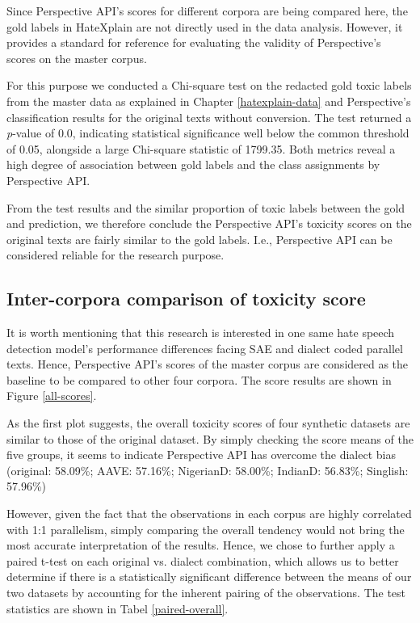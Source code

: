\documentclass[11pt]{article}
\begin{document}
Since Perspective API’s scores for different corpora are being compared here, the gold labels in HateXplain are not directly used in the data analysis. However, it provides a standard for reference for evaluating the validity of Perspective’s scores on the master corpus.

For this purpose we conducted a Chi-square test on the redacted gold toxic labels from the master data as explained in Chapter \ref{hatexplain-data} and Perspective’s classification results for the original texts without conversion. The test returned a \textit{p}-value of 0.0, indicating statistical significance well below the common threshold of 0.05, alongside a large Chi-square statistic of 1799.35. Both metrics reveal a high degree of association between gold labels and the class assignments by Perspective API.

From the test results and the similar proportion of toxic labels between the gold and prediction, we therefore conclude the Perspective API's toxicity scores on the original texts are fairly similar to the gold labels. I.e., Perspective API can be considered reliable for the research purpose.

\subsection{Inter-corpora comparison of toxicity score}

It is worth mentioning that this research is interested in one same hate speech detection model’s performance differences facing SAE and dialect coded parallel texts. Hence, Perspective API’s scores of the master corpus are considered as the baseline to be compared to other four corpora. The score results are shown in Figure \ref{all-scores}.

As the first plot suggests, the overall toxicity scores of four synthetic datasets are similar to those of the original dataset. By simply checking the score means of the five groups, it seems to indicate Perspective API has overcome the dialect bias (original: 58.09\%; AAVE: 57.16\%; NigerianD: 58.00\%; IndianD: 56.83\%; Singlish: 57.96\%)

However, given the fact that the observations in each corpus are highly correlated with 1:1 parallelism, simply comparing the overall tendency would not bring the most accurate interpretation of the results. Hence, we chose to further apply a paired t-test on each original vs. dialect combination, which allows us to better determine if there is a statistically significant difference between the means of our two datasets by accounting for the inherent pairing of the observations. The test statistics are shown in Tabel \ref{paired-overall}.
\end{document}
